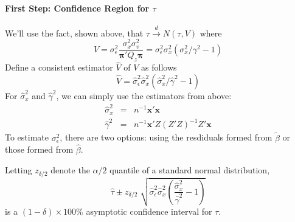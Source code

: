 \documentclass[12pt]{article}
\theoremstyle{definition}
\begin{document}
\paragraph{First Step: Confidence Region for $\tau$}
We'll use the fact, shown above, that $\widehat{\tau} \overset{d}{\rightarrow} N(\tau,V)$ where 
$$V = \sigma_\epsilon^2 \frac{\sigma_x^2\sigma_v^2}{\boldsymbol{\pi}'Q_z \boldsymbol{\pi}} = \sigma^2_\epsilon \sigma^2_x \left(\sigma_x^2/\gamma^2 - 1 \right)$$
Define a consistent estimator $\widehat{V}$ of $V$ as follows
  $$\widehat{V} = \widehat{\sigma}^2_\epsilon \widehat{\sigma}^2_x \left(\widehat{\sigma}_x^2/\widehat{\gamma}^2 - 1 \right)$$
For $\widehat{\sigma}^2_x$ and $\widehat{\gamma}^2$, we can simply use the estimators from above:
 \begin{eqnarray*}
    \widehat{\sigma}_x^2 &=& n^{-1}\mathbf{x}'\mathbf{x} \\
    \widehat{\gamma}^2 &=& n^{-1} \mathbf{x}'Z(Z'Z)^{-1}Z'\mathbf{x}
  \end{eqnarray*}
To estimate $\sigma_\epsilon^2$, there are two options: using the resdiduals formed from $\widetilde{\beta}$ or those formed from $\widehat{\beta}$. 

Letting $z_{\delta/2}$ denote the $\alpha/2$ quantile of a standard normal distribution,
  $$\widehat{\tau} \pm z_{\delta/2} \; \sqrt{\widehat{\sigma}^2_\epsilon \widehat{\sigma}^2_x \left(\frac{\widehat{\sigma}_x^2}{\widehat{\gamma}^2} - 1 \right)}$$
is a $(1-\delta) \times 100\%$ asymptotic confidence interval for $\tau$.
\end{document}
